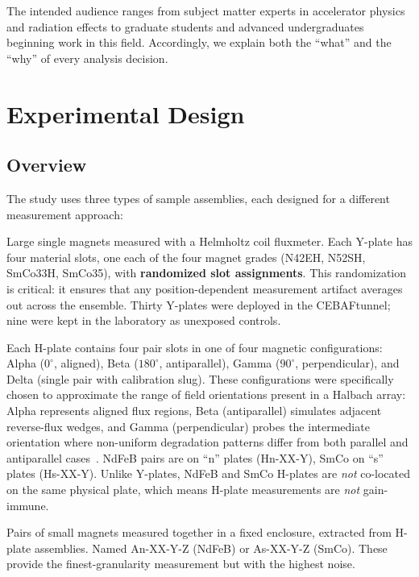 \documentclass[11pt,letterpaper]{article}
\newcommand{\CEBAF}{CEBAF}
\begin{document}
The intended audience ranges from subject matter experts in accelerator physics
and radiation effects to graduate students and advanced undergraduates beginning
work in this field. Accordingly, we explain both the ``what'' and the ``why'' of
every analysis decision.

\section{Experimental Design}
\label{sec:design}

\subsection{Overview}

The study uses three types of sample assemblies, each designed for a different
measurement approach:

\begin{description}[style=nextline]
    \item[Y-plates (primary measurement)]
    Large single magnets measured with a Helmholtz coil fluxmeter. Each Y-plate
    has four material slots, one each of the four magnet grades (N42EH, N52SH,
    SmCo33H, SmCo35), with \textbf{randomized slot assignments}. This
    randomization is critical: it ensures that any position-dependent
    measurement artifact averages out across the ensemble. Thirty Y-plates were
    deployed in the \CEBAF tunnel; nine were kept in the laboratory as
    unexposed controls.

    \item[H-plates (pair assemblies)]
    Each H-plate contains four pair slots in one of four magnetic
    configurations: Alpha ($0^\circ$, aligned), Beta ($180^\circ$,
    antiparallel), Gamma ($90^\circ$, perpendicular), and Delta
    (single pair with calibration slug). These configurations were specifically
    chosen to approximate the range of field orientations present in a Halbach
    array: Alpha represents aligned flux regions, Beta (antiparallel) simulates
    adjacent reverse-flux wedges, and Gamma (perpendicular) probes the
    intermediate orientation where non-uniform degradation patterns differ from
    both parallel and antiparallel cases~\cite{NGotta2024,Brooks2017}.
    NdFeB pairs are on ``n'' plates (Hn-XX-Y), SmCo on ``s'' plates
    (Hs-XX-Y). Unlike Y-plates, NdFeB and SmCo H-plates are \emph{not}
    co-located on the same physical plate, which means H-plate measurements
    are \emph{not} gain-immune.

    \item[A-samples (individual magnets)]
    Pairs of small magnets measured together in a fixed enclosure, extracted
    from H-plate assemblies. Named An-XX-Y-Z (NdFeB) or As-XX-Y-Z (SmCo).
    These provide the finest-granularity measurement but with the highest
    noise.
\end{description}
\end{document}
